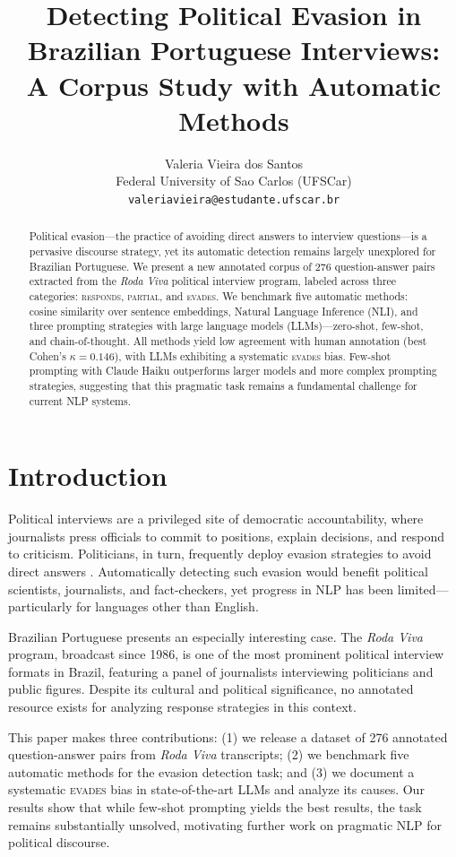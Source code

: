 \documentclass[11pt]{article}
\title{Detecting Political Evasion in Brazilian Portuguese Interviews:\\
A Corpus Study with Automatic Methods}
\author{Valeria Vieira dos Santos \\
  Federal University of Sao Carlos (UFSCar) \\
  \texttt{valeriavieira@estudante.ufscar.br}}
\begin{document}
\maketitle

\begin{abstract}
Political evasion---the practice of avoiding direct answers to interview questions---is a pervasive discourse strategy, yet its automatic detection remains largely unexplored for Brazilian Portuguese. We present a new annotated corpus of 276 question-answer pairs extracted from the \textit{Roda Viva} political interview program, labeled across three categories: \textsc{responds}, \textsc{partial}, and \textsc{evades}. We benchmark five automatic methods: cosine similarity over sentence embeddings, Natural Language Inference (NLI), and three prompting strategies with large language models (LLMs)---zero-shot, few-shot, and chain-of-thought. All methods yield low agreement with human annotation (best Cohen's $\kappa = 0.146$), with LLMs exhibiting a systematic \textsc{evades} bias. Few-shot prompting with Claude Haiku outperforms larger models and more complex prompting strategies, suggesting that this pragmatic task remains a fundamental challenge for current NLP systems.
\end{abstract}

\section{Introduction}

Political interviews are a privileged site of democratic accountability, where journalists press officials to commit to positions, explain decisions, and respond to criticism. Politicians, in turn, frequently deploy evasion strategies to avoid direct answers \cite{bull1994politician,clayman2001answers}. Automatically detecting such evasion would benefit political scientists, journalists, and fact-checkers, yet progress in NLP has been limited---particularly for languages other than English.

Brazilian Portuguese presents an especially interesting case. The \textit{Roda Viva} program, broadcast since 1986, is one of the most prominent political interview formats in Brazil, featuring a panel of journalists interviewing politicians and public figures. Despite its cultural and political significance, no annotated resource exists for analyzing response strategies in this context.

This paper makes three contributions: (1) we release a dataset of 276 annotated question-answer pairs from \textit{Roda Viva} transcripts; (2) we benchmark five automatic methods for the evasion detection task; and (3) we document a systematic \textsc{evades} bias in state-of-the-art LLMs and analyze its causes. Our results show that while few-shot prompting yields the best results, the task remains substantially unsolved, motivating further work on pragmatic NLP for political discourse.
\end{document}
